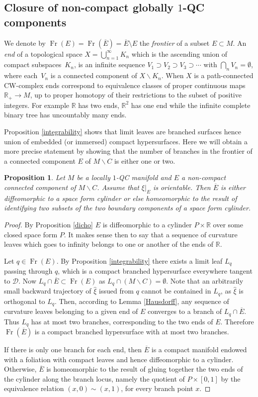 \documentclass[10pt]{amsart}
\let\mathcal\mathscr
\let\moins\smallsetminus
\DeclareMathOperator{\Fr}{Fr}
\newtheorem{proposition}[theorem]{Proposition}
\theoremstyle{definition}
\theoremstyle{remark}
\numberwithin{equation}{section}
\newcommand{\RR}{\mathbb R}
\let\Subsection\subsection\let\Subsubsection\subsubsection
\begin{document}
\Subsection{Closure of non-compact globally $1$-QC components}
We denote by $\Fr(E)=\Fr(\overline{E})=\overline{E}\setminus E$ the \emph{frontier} of a subset $E\subset M$.
An \emph{end} of a topological space $X=\bigcup_{n=1}^{\infty}K_n$ which is the ascending union of compact subspaces~$K_n$,
is an infinite sequence $V_1\supset V_2 \supset V_3 \supset \cdots$ with $\bigcap_n V_n=\emptyset$, where
each~$V_n$ is a connected component of $X\moins K_n$. When $X$ is a path-connected CW\nobreakdash-complex ends correspond to
equivalence classes of proper continuous maps $\RR_+\to M$,
up to proper homotopy of their restrictions to the subset of positive integers.
For example $\RR$ has two ends, $\RR^2$ has one end while
the infinite complete binary tree has uncountably many ends.

Proposition \ref{integrability} shows that limit leaves are branched surfaces hence union of embedded (or immersed)
compact hypersurfaces. Here we will obtain a more precise statement by showing that the number of branches
in the frontier of a connected component $E$ of $M\moins C$ is either one or two.

\begin{proposition}\label{bdy}
Let $M$ be a locally $1$-QC manifold and $E$ a non-compact connected component of $M\moins C$. Assume that $\xi|_E$ is orientable.
Then $\overline{E}$ is either diffeomorphic to a space form cylinder or else homeomorphic to the result of identifying
two subsets of the two boundary components of a space form cylinder.
\end{proposition}
\begin{proof}
By Proposition \ref{dicho} $E$ is diffeomorphic to a cylinder $P\times \RR$ over some closed
space form $P$.
It makes sense then to say that a sequence of curvature leaves which goes to infinity
belongs to one or another of the ends of $\RR$.

Let $q\in \Fr(E)$. By Proposition \ref{integrability} there exists a limit leaf $L_q$ passing through $q$, which is a compact branched hypersurface everywhere tangent to $\mathcal D$. Now $L_q\cap \overline{E}\subset \Fr(E)$ as $L_q\cap (M\moins C)=\emptyset$.
Note that an arbitrarily small backward trajectory of $\widehat{\xi}$ issued from $q$
cannot be contained in $L_q$, as $\widehat{\xi}$ is orthogonal to $L_q$. Then, according to Lemma \ref{Hausdorff}, any sequence of curvature leaves belonging to a
given end of $E$ converges to a branch of $L_q\cap \overline{E}$.
Thus $L_q$ has at most two branches, corresponding to the two ends of $E$.
Therefore $\Fr(\overline{E})$ is a compact branched hypersurface with at most two branches.

If there is only one branch for each end, then $\overline{E}$ is a compact manifold endowed with a foliation with compact leaves and
hence diffeomorphic to a cylinder. Otherwise, $\overline{E}$ is homeomorphic to the
result of gluing together the two ends of the cylinder along
the branch locus, namely the quotient of $P\times [0,1]$ by the equivalence relation
$(x,0)\sim (x,1)$, for every branch point $x$.
\end{proof}
\end{document}
